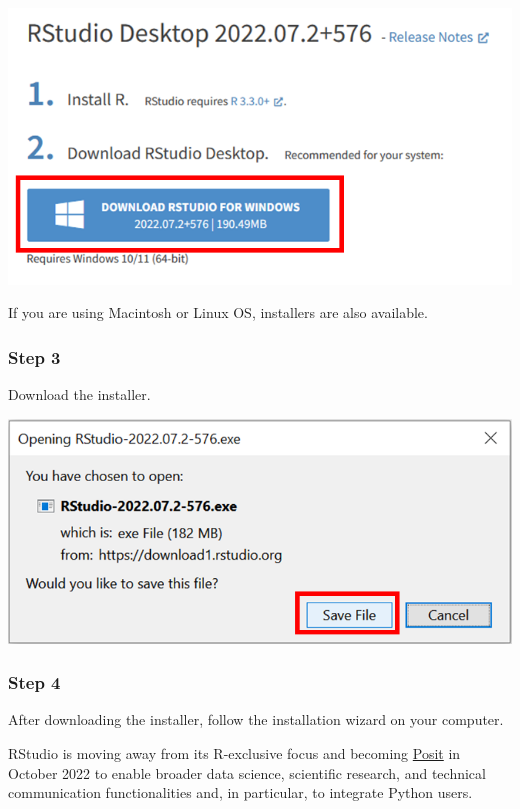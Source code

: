 \documentclass[
  letterpaper,
  DIV=11,
  numbers=noendperiod]{scrreprt}
\begin{document}
\includegraphics{./images/paste-027BCBD8.png}

If you are using Macintosh or Linux OS, installers are also available.

\hypertarget{step-3-1}{%
\subsubsection{Step 3}\label{step-3-1}}

Download the installer.

\includegraphics{./images/paste-8FBADC1E.png}

\hypertarget{step-4-1}{%
\subsubsection{Step 4}\label{step-4-1}}

After downloading the installer, follow the installation wizard on your
computer.

\begin{tcolorbox}[enhanced jigsaw, leftrule=.75mm, breakable, coltitle=black, opacitybacktitle=0.6, colframe=quarto-callout-note-color-frame, bottomrule=.15mm, toptitle=1mm, left=2mm, opacityback=0, colbacktitle=quarto-callout-note-color!10!white, rightrule=.15mm, bottomtitle=1mm, arc=.35mm, titlerule=0mm, title=\textcolor{quarto-callout-note-color}{\faInfo}\hspace{0.5em}{Note}, toprule=.15mm, colback=white]
RStudio is moving away from its R-exclusive focus and becoming
\href{https://posit.co/}{Posit} in October 2022 to enable broader data
science, scientific research, and technical communication
functionalities and, in particular, to integrate Python users.
\end{tcolorbox}
\end{document}
